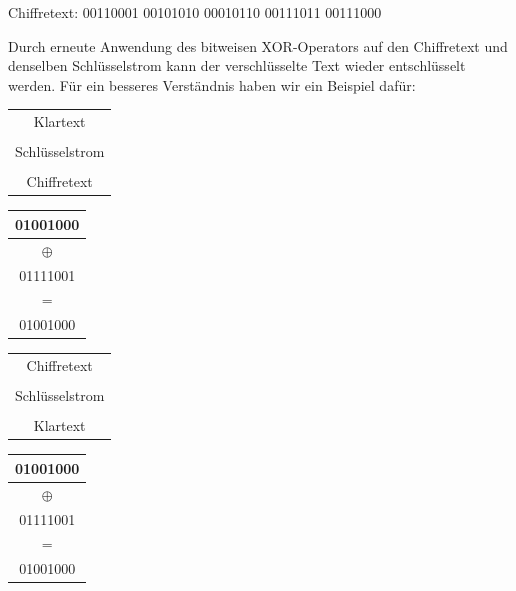\documentclass[course=erap]{aspdoc}
\begin{document}
\begin{center}
Chiffretext: 00110001 00101010 00010110 00111011 00111000
\end{center}

Durch erneute Anwendung des bitweisen XOR-Operators auf den Chiffretext und denselben Schlüsselstrom kann der 
verschlüsselte Text wieder entschlüsselt werden. Für ein besseres Verständnis haben wir ein Beispiel dafür:
\begin{center}
\begin{tabular}{c}
Klartext\\
\\
Schlüsselstrom\\
\\
Chiffretext\\
\end{tabular}
\quad
\begin{tabular}{|c|}
\hline
01001000\\
\hline
\(\oplus\) \\
\hline
01111001 \\
\hline
= \\
\hline
01001000 \\
\hline
\end{tabular}
\quad
\begin{tabular}{c}
Chiffretext\\
\\
Schlüsselstrom\\
\\
Klartext\\
\end{tabular}
\quad
\begin{tabular}{|c|}
\hline
01001000\\
\hline
\(\oplus\) \\
\hline
01111001 \\
\hline
= \\
\hline
01001000\\
\hline
\end{tabular}
\end{center}
\end{document}

